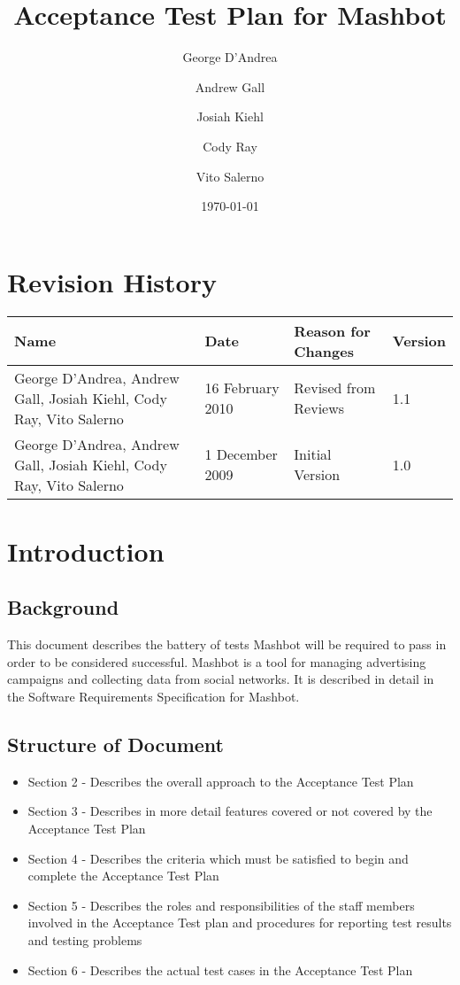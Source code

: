 \documentclass{article}
\begin{document}
\pagestyle{plain}
\title{Acceptance Test Plan for Mashbot} 
\author{George D'Andrea \and Andrew Gall \and Josiah Kiehl \and
  Cody Ray \and Vito Salerno}
\date{\today}
\begin{titlepage}
\maketitle
\end{titlepage}

\section*{Revision History}
\begin{tabular}{|p{2in}|l|l|l|}
  \hline
  \textbf{Name} & \textbf{Date} & \textbf{Reason for Changes} & \textbf{Version} \\
  \hline \hline
  George D'Andrea, Andrew Gall, Josiah Kiehl, Cody Ray, Vito
  Salerno & 16 February 2010 & Revised from Reviews & 1.1 \\
  \hline
  George D'Andrea, Andrew Gall, Josiah Kiehl, Cody Ray, Vito
  Salerno & 1 December 2009 & Initial Version & 1.0 \\
  \hline
\end{tabular}

\clearpage
\tableofcontents
\clearpage

\section{Introduction} %

\subsection{Background}

This document describes the battery of tests Mashbot will be required
to pass in order to be considered successful. Mashbot is a tool for
managing advertising campaigns and collecting data from social
networks. It is described in detail in the Software Requirements
Specification for Mashbot.

\subsection{Structure of Document}
\begin{itemize}
  \item Section 2 - Describes the overall approach to the Acceptance
    Test Plan
  \item Section 3 - Describes in more detail features covered
    or not covered by the Acceptance Test Plan
  \item Section 4 - Describes the criteria which must be satisfied to
    begin and complete the Acceptance Test Plan
  \item Section 5 - Describes the roles and responsibilities of the
    staff members involved in the Acceptance Test plan and procedures for
    reporting test results and testing problems
  \item Section 6 - Describes the actual test cases in the Acceptance
    Test Plan
\end{itemize}
\end{document}
